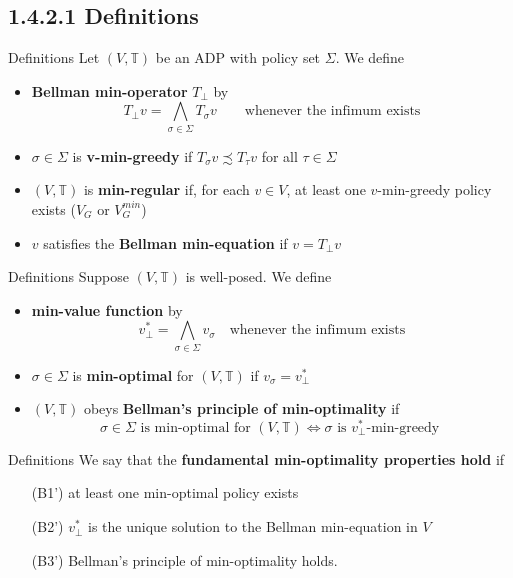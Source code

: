 \documentclass[aspectratio=169]{beamer} %
\begin{document}
\subsection{1.4.2.1 Definitions}
\begin{frame}{Definitions}
Let $(V,\mathbb{T})$ be an ADP with policy set $\Sigma$. We define
\begin{itemize}
    \item \textbf{Bellman min-operator} $T_\perp$ by 
    $$
    T_\perp v = \bigwedge_{\sigma\in\Sigma} T_\sigma v\qquad \text{whenever the infimum exists}
    $$
    \item $\sigma \in\Sigma$ is \textbf{v-min-greedy} if $T_\sigma v\precsim T_\tau v$ for all $\tau\in\Sigma$
    \item $(V,\mathbb{T})$ is \textbf{min-regular} if, for each $v\in V$, at least one $v$-min-greedy policy exists ($V_G$ or $V_G^{min}$)
    \item $v$ satisfies the \textbf{Bellman min-equation} if $v=T_\perp v$
\end{itemize}
\end{frame}
\begin{frame}{Definitions}
    Suppose $(V,\mathbb{T})$ is well-posed. We define
    \begin{itemize}
        \item \textbf{min-value function} by
        $$v^*_\perp = \bigwedge_{\sigma\in\Sigma} v_\sigma \quad\text{whenever the infimum exists}$$
        \item $\sigma\in\Sigma$ is \textbf{min-optimal} for $(V,\mathbb{T})$ if $v_\sigma = v_\perp^*$ 
        \item $(V,\mathbb{T})$ obeys \textbf{Bellman's principle of min-optimality} if
        $$
        \sigma\in\Sigma \text{  is min-optimal for $(V,\mathbb{T})\iff \sigma$ is $v^*_\perp$-min-greedy }
        $$
    \end{itemize}
\end{frame}
\begin{frame}{Definitions}
    We say that the \textbf{fundamental min-optimality properties hold} if
    \begin{enumerate}
        \item[(B1')] at least one min-optimal policy exists
        \item[(B2')] $v_\perp^*$ is the unique solution to the Bellman min-equation in $V$
        \item[(B3')] Bellman's principle of min-optimality holds.
    \end{enumerate}
\end{frame}
\end{document}
